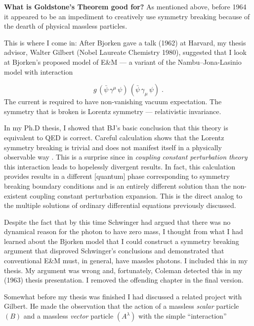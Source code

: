 \documentclass[letterpaper,twoside,preprintnumbers,slac_one]{revtex4}
\begin{document}
\textbf{What is Goldstone's Theorem good for?}
As mentioned above, before 1964 it appeared to be an impediment to creatively use symmetry breaking
because of the dearth of physical massless particles.

This is where I come in: After Bjorken gave a talk (1962) at Harvard,
my thesis advisor, Walter Gilbert (Nobel Laureate Chemistry 1980),
suggested that I look at Bjorken's proposed model of E\&M \cite{jb;1963} --- a
variant of the Nambu--Jona-Lasinio model with interaction

\begin{equation*}
  g\, (\bar\psi\, \gamma^{\mu}\, \psi)\, (\bar\psi\, \gamma_{\mu}\, \psi) \; .
\end{equation*}
The current is required to have non-vanishing vacuum expectation.
The symmetry that is broken is Lorentz symmetry --- relativistic
invariance.

In my Ph.D thesis, I showed that BJ's basic conclusion that this
theory is equivalent to QED is correct. Careful calculation shows that
the Lorentz symmetry breaking is trivial and does not manifest itself
in a physically observable way \cite{ggff1;1964,ggff2;1964}. This is a surprise since in
\emph{coupling constant perturbation theory} this interaction leads
to hopelessly divergent results. In fact, this calculation provides results in a different [quantum]
phase corresponding to symmetry breaking boundary conditions and is an
entirely different solution than the non-existent coupling constant
perturbation expansion. This is the direct analog to the multiple solutions of  ordinary
differential equations previously discussed.


Despite the fact that by this time Schwinger \cite{sch1;1962} had
argued that there was no dynamical reason for the photon to have zero
mass, I thought from what I had learned about the Bjorken model that I
could construct a symmetry breaking argument that disproved Schwinger's
conclusions and demonstrated that conventional E\&M must, in general,
have massles photons. I included this in my thesis. My argument was
wrong and, fortunately, Coleman detected this in my (1963) thesis
presentation. I removed the offending chapter in the final version.

Somewhat before my thesis was finished I had discussed a related
project with Gilbert. He made the observation that the action of a
massless \emph{scalar} particle $(B)$ and a massless \emph{vector}
particle $(A^{\lambda})$ with the simple ``interaction''
\end{document}
